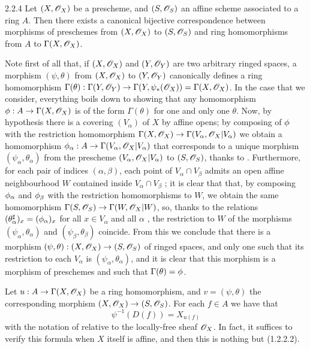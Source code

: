 \begin{envs}[Proposition]{2.2.4}
\label{prop-1.2.2.4}
Let $(X,\mathscr{O}_X)$ be a prescheme, and $(S,\mathscr{O}_S)$ an
affine scheme associated to a ring $A$. Then there exists a canonical bijective
correspondence between morphisms of preschemes from $(X,\mathscr{O}_X)$ to $(S,\mathscr{O}_S)$ and
ring homomorphisms from $A$ to $\Gamma(X,\mathscr{O}_X)$.
\end{envs}

Note first of all that, if $(X,\mathscr{O}_X)$ and $(Y,\mathscr{O}_Y)$ are two arbitrary ringed spaces,
a morphism $(\psi,\theta)$ from $(X,\mathscr{O}_X)$ to $(Y,\mathscr{O}_Y)$ canonically defines a ring
homomorphism
$\Gamma(\theta):\Gamma(Y,\mathscr{O}_Y)\to\Gamma(Y,\psi_*(\mathscr{O}_X))=\Gamma(X,\mathscr{O}_X)$.
In the case that we consider, everything boils down to showing that any
homomorphism $\phi:A\to\Gamma(X,\mathscr{O}_X)$ is of the form $\Gamma(\theta)$
for one and only one $\theta$. Now, by hypothesis there is a covering
$(V_\alpha)$ of $X$ by affine opens; by composing of $\phi$ with the
restriction homomorphism $\Gamma(X,\mathscr{O}_X)\to\Gamma(V_\alpha,\mathscr{O}_X|V_\alpha)$ we
obtain a homomorphism $\phi_\alpha:A\to\Gamma(V_\alpha,\mathscr{O}_X|V_\alpha)$
that corresponds to a unique morphism $(\psi_\alpha,\theta_\alpha)$ from the
prescheme $(V_\alpha,\mathscr{O}_X|V_\alpha)$ to $(S,\mathscr{O}_S)$, thanks to .
Furthermore, for each pair of indices $(\alpha,\beta)$, each point of
$V_\alpha\cap V_\beta$ admits an open affine neighbourhood $W$ contained inside
$V_\alpha\cap V_\beta$ ; it is clear that that, by composing
$\phi_\alpha$ and $\phi_\beta$ with the restriction homomorphisms to $W$,
we obtain the same homomorphism $\Gamma(S,\mathscr{O}_S)\to\Gamma(W,\mathscr{O}_X|W)$, so, thanks
to the relations $(\theta_\alpha^\sharp)_x=(\phi_\alpha)_x$ for all $x\in
V_\alpha$ and all $\alpha$ , the restriction to $W$ of the morphisms
$(\psi_\alpha,\theta_\alpha)$ and $(\psi_\beta,\theta_\beta)$ coincide. From
this we conclude that there is a morphism
$(\psi,\theta):(X,\mathscr{O}_X)\to(S,\mathscr{O}_S)$ of ringed spaces, and only one such
that its restriction to each $V_\alpha$ is $(\psi_\alpha,\theta_\alpha)$, and it
is clear that this morphism is a morphism of preschemes and such that
$\Gamma(\theta)=\phi$.

Let $u:A\to\Gamma(X,\mathscr{O}_X)$ be a ring homomorphism, and $v=(\psi,\theta)$
the corresponding morphism $(X,\mathscr{O}_X)\to(S,\mathscr{O}_S)$. For each $f\in A$ we have
that
\[
  \psi^{-1}(D(f))=X_{u(f)}
  \tag{2.2.4.1}
\]
with the notation of  relative to the locally-free sheaf
$\mathscr{O}_X$. In fact, it suffices to verify this formula when $X$ itself is affine,
and then this is nothing but (1.2.2.2).

